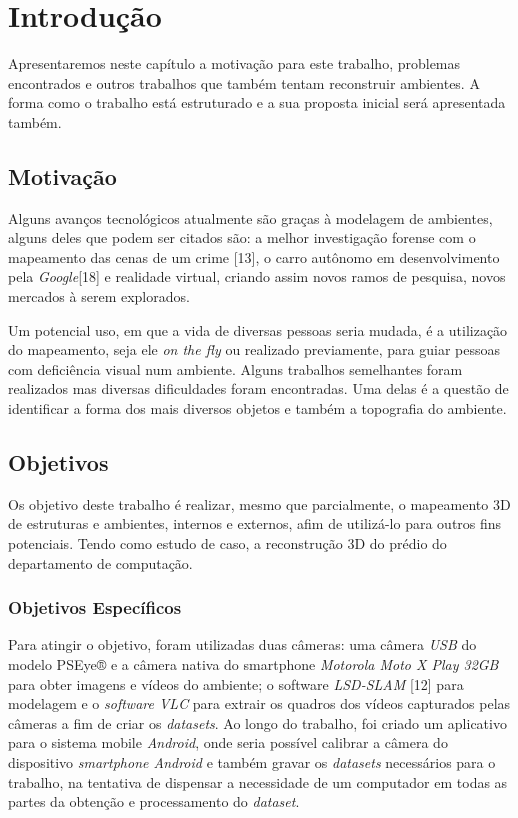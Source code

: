 \chapter{Introdução}

Apresentaremos neste capítulo a motivação para este trabalho, problemas encontrados e outros trabalhos que também tentam reconstruir ambientes. A forma como o trabalho está estruturado e a sua proposta inicial será apresentada também.

\section{Motivação}

Alguns avanços tecnológicos atualmente são graças à modelagem de ambientes, alguns deles que podem ser citados são: a melhor investigação forense com o mapeamento das cenas de um crime [13], o carro autônomo em desenvolvimento pela \textit{Google}[18] e realidade virtual, criando assim novos ramos de pesquisa, novos mercados à serem explorados.

Um potencial uso, em que a vida de diversas pessoas seria mudada, é a utilização do mapeamento, seja ele \textit{on the fly} ou realizado previamente, para guiar pessoas com deficiência visual num ambiente. Alguns trabalhos semelhantes foram realizados mas diversas dificuldades foram encontradas. Uma delas é a questão de identificar a forma dos mais diversos objetos e também a topografia do ambiente. 


\section{Objetivos}

Os objetivo deste trabalho é realizar, mesmo que parcialmente, o mapeamento 3D de estruturas e ambientes, internos e externos, afim de utilizá-lo para outros fins potenciais. Tendo como estudo de caso, a reconstrução 3D do prédio do departamento de computação.

\subsection{Objetivos Específicos}

Para atingir o objetivo, foram utilizadas duas câmeras: uma câmera \textit{USB} do modelo PSEye® e a câmera nativa do smartphone \textit{Motorola Moto X Play 32GB} para obter imagens e vídeos do ambiente; o software \textit{LSD-SLAM} [12] para modelagem e o \textit{software VLC} para extrair os quadros dos vídeos capturados pelas câmeras a fim de criar os \textit{datasets}. Ao longo do trabalho, foi criado um aplicativo para o sistema mobile \textit{Android}, onde seria possível calibrar a câmera do dispositivo \textit{smartphone Android} e também gravar os \textit{datasets} necessários para o trabalho, na tentativa de dispensar a necessidade de um computador em todas as partes da obtenção e processamento do \textit{dataset}.


